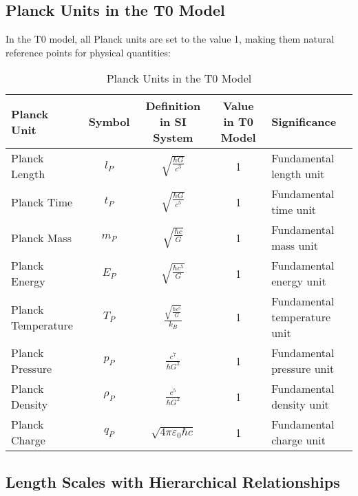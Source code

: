 \documentclass[12pt,a4paper]{article}
\begin{document}
	\subsection*{Planck Units in the T0 Model}
	
	In the T0 model, all Planck units are set to the value 1, making them natural reference points for physical quantities:
	
	\begin{table}[H]
		\centering
		\begin{adjustbox}{width=0.95\textwidth}
			\begin{tabular}{lcccl}
				\toprule
				\textbf{Planck Unit} & \textbf{Symbol} & \textbf{Definition in SI System} & \textbf{Value in T0 Model} & \textbf{Significance} \\
				\midrule
				Planck Length & \(l_P\) & \(\sqrt{\frac{\hbar G}{c^3}}\) & 1 & Fundamental length unit \\
				Planck Time & \(t_P\) & \(\sqrt{\frac{\hbar G}{c^5}}\) & 1 & Fundamental time unit \\
				Planck Mass & \(m_P\) & \(\sqrt{\frac{\hbar c}{G}}\) & 1 & Fundamental mass unit \\
				Planck Energy & \(E_P\) & \(\sqrt{\frac{\hbar c^5}{G}}\) & 1 & Fundamental energy unit \\
				Planck Temperature & \(T_P\) & \(\frac{\sqrt{\frac{\hbar c^5}{G}}}{k_B}\) & 1 & Fundamental temperature unit \\
				Planck Pressure & \(p_P\) & \(\frac{c^7}{\hbar G^2}\) & 1 & Fundamental pressure unit \\
				Planck Density & \(\rho_P\) & \(\frac{c^5}{\hbar G^2}\) & 1 & Fundamental density unit \\
				Planck Charge & \(q_P\) & \(\sqrt{4\pi \varepsilon_0 \hbar c}\) & 1 & Fundamental charge unit \\
				\bottomrule
			\end{tabular}
		\end{adjustbox}
		\caption{Planck Units in the T0 Model}
		\label{tab:planck_units}
	\end{table}
	
	\subsection*{Length Scales with Hierarchical Relationships}
	
\end{document}
